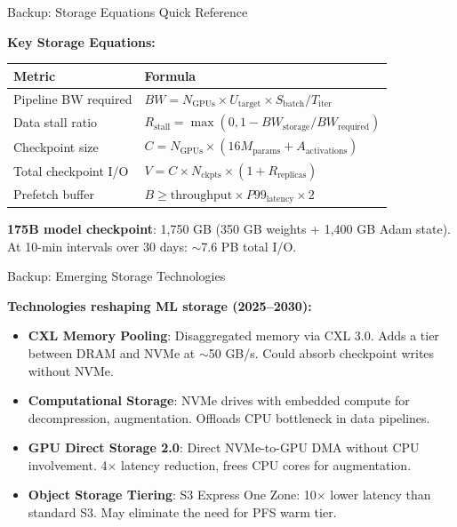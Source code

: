 \documentclass[aspectratio=169, 12pt]{beamer}
\begin{document}
\appendix

\begin{frame}{Backup: Storage Equations Quick Reference}
\note{
[2 min]
}

\footnotesize
\textbf{Key Storage Equations:}

\vspace{0.15cm}
\renewcommand{\arraystretch}{1.3}
\begin{tabular}{@{}ll@{}}
  \toprule
  \textbf{Metric} & \textbf{Formula} \\
  \midrule
  Pipeline BW required & $BW = N_{\text{GPUs}} \times U_{\text{target}} \times S_{\text{batch}} / T_{\text{iter}}$ \\
  Data stall ratio & $R_{\text{stall}} = \max(0, 1 - BW_{\text{storage}} / BW_{\text{required}})$ \\
  Checkpoint size & $C = N_{\text{GPUs}} \times (16M_{\text{params}} + A_{\text{activations}})$ \\
  Total checkpoint I/O & $V = C \times N_{\text{ckpts}} \times (1 + R_{\text{replicas}})$ \\
  Prefetch buffer & $B \geq \text{throughput} \times P99_{\text{latency}} \times 2$ \\
  \bottomrule
\end{tabular}

\vspace{0.15cm}
{\footnotesize \textbf{175B model checkpoint}: 1,750 GB (350 GB weights + 1,400 GB Adam state). At 10-min intervals over 30 days: $\sim$7.6 PB total I/O.}

\end{frame}

\begin{frame}{Backup: Emerging Storage Technologies}
\note{
[2 min]
}

\footnotesize
\textbf{Technologies reshaping ML storage (2025--2030):}

\vspace{0.15cm}
\begin{itemize}\setlength\itemsep{2pt}
  \item \textbf{CXL Memory Pooling}: Disaggregated memory via CXL 3.0. Adds a tier between DRAM and NVMe at $\sim$50 GB/s. Could absorb checkpoint writes without NVMe.
  \item \textbf{Computational Storage}: NVMe drives with embedded compute for decompression, augmentation. Offloads CPU bottleneck in data pipelines.
  \item \textbf{GPU Direct Storage 2.0}: Direct NVMe-to-GPU DMA without CPU involvement. 4$\times$ latency reduction, frees CPU cores for augmentation.
  \item \textbf{Object Storage Tiering}: S3 Express One Zone: 10$\times$ lower latency than standard S3. May eliminate the need for PFS warm tier.
\end{itemize}

\end{frame}
\end{document}
